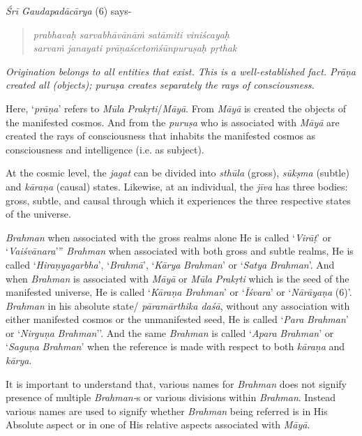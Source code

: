 \emph{Śrī Gaudapadācārya} (6) says-
\vskip -10pt

\begin{verse}
\emph{prabhavaḥ sarvabhāvānāṁ satāmiti viniścayaḥ }\\
\emph{sarvaṁ janayati prāṇaścetoṁśūnpuruṣaḥ pṛthak }
\end{verse}
\vskip -10pt

\emph{Origination belongs to all entities that exist. This is a well-established fact. Prāṇa created all (objects); puruṣa creates separately the rays of consciousness.}

Here, `\emph{prāṇa}' refers to \emph{Mūla} \emph{Prakṛti}/\emph{Māyā}. From \emph{Māyā} is created the objects of the manifested cosmos. And from the \emph{puruṣa} who is associated with \emph{Māyā} are created the rays of consciousness that inhabits the manifested cosmos as consciousness and intelligence (i.e. as subject).

At the cosmic level, the \emph{jagat} can be divided into \emph{sthūla} (gross), \emph{sūkṣma} (subtle) and \emph{kāraṇa} (causal) states. Likewise, at an individual, the \emph{jīva} has three bodies: gross, subtle, and causal through which it experiences the three respective states of the universe.

\emph{Brahman} when associated with the gross realms alone He is called `\emph{Virāṭ}' or `\emph{Vaiśvānara}''' \emph{Brahman} when associated with both gross and subtle realms, He is called `\emph{Hiraṇyagarbha}', `\emph{Brahmā}', `\emph{Kārya} \emph{Brahman}' or `\emph{Satya} \emph{Brahman}'. And when \emph{Brahman} is associated with \emph{Māyā} or \emph{Mūla} \emph{Prakṛti} which is the seed of the manifested universe, He is called `\emph{Kāraṇa} \emph{Brahman}' or `\emph{Īśvara}' or `\emph{Nārāyaṇa} (6)'. \emph{Brahman} in his absolute state/ \emph{pāramārthika daśā}, without any association with either manifested cosmos or the unmanifested seed, He is called `\emph{Para} \emph{Brahman}' or `\emph{Nirguṇa} \emph{Brahman}''. And the same \emph{Brahman} is called `\emph{Apara} \emph{Brahman}' or `\emph{Saguṇa} \emph{Brahman}' when the reference is made with respect to both \emph{kāraṇa} and \emph{kārya}.

It is important to understand that, various names for \emph{Brahman} does not signify presence of multiple \emph{Brahman-}s or various divisions within \emph{Brahman}. Instead various names are used to signify whether \emph{Brahman} being referred is in His Absolute aspect or in one of His relative aspects associated with \emph{Māyā}.

